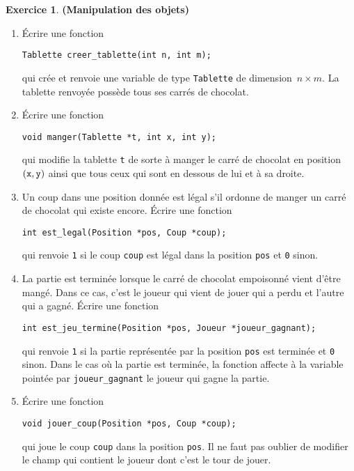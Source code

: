 \documentclass[12pt]{article}
\theoremstyle{definition}
\newtheorem{Exercice}{Exercice}
\begin{document}
\begin{Exercice} {\bf (Manipulation des objets)}\smallskip
\label{ex:2}

    \begin{enumerate}
        \item Écrire une fonction
\begin{lstlisting}
Tablette creer_tablette(int n, int m);
\end{lstlisting}
        qui crée et renvoie une variable de type {\tt Tablette} de
        dimension~$n \times m$. La tablette renvoyée possède tous ses
        carrés de chocolat.
        \smallskip

        \item Écrire une fonction
\begin{lstlisting}
void manger(Tablette *t, int x, int y);
\end{lstlisting}
        qui modifie la tablette {\tt t} de sorte à manger le carré de 
        chocolat en position $({\tt x}, {\tt y})$ ainsi que tous ceux 
        qui sont en dessous de lui et à sa droite.
        \smallskip

        \item Un coup dans une position donnée est légal s'il ordonne de 
        manger un carré de chocolat qui existe encore. Écrire une fonction
\begin{lstlisting}
int est_legal(Position *pos, Coup *coup);
\end{lstlisting}
        qui renvoie {\tt 1} si le coup {\tt coup} est légal dans la 
        position {\tt pos} et {\tt 0} sinon.
        \smallskip

        \item La partie est terminée lorsque le carré de chocolat 
        empoisonné vient d'être mangé. Dans ce cas, c'est le joueur qui 
        vient de jouer qui a perdu et l'autre qui a gagné. Écrire une 
        fonction
\begin{lstlisting}
int est_jeu_termine(Position *pos, Joueur *joueur_gagnant);
\end{lstlisting}
        qui renvoie {\tt 1} si la partie représentée par la position 
        {\tt pos} est terminée et {\tt 0} sinon. Dans le cas où la partie 
        est terminée, la fonction affecte à la variable pointée par 
        {\tt joueur\_gagnant} le joueur qui gagne la partie.
        \smallskip

        \item Écrire une fonction
\begin{lstlisting}
void jouer_coup(Position *pos, Coup *coup);
\end{lstlisting}
        qui joue le coup {\tt coup} dans la position {\tt pos}. Il ne 
        faut pas oublier de modifier le champ qui contient le joueur 
        dont c'est le tour de jouer.
    \end{enumerate}
\end{Exercice}
\bigskip
\end{document}
